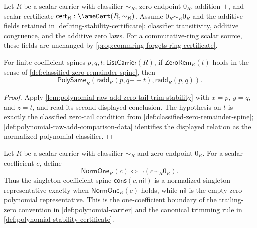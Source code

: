 \begin{proposition}
\label{prop:polynomial-raw-add-right-zero-tail-invariance}
Let $R$ be a scalar carrier with classifier $\sim_R$, zero endpoint $0_R$, addition $+$, and scalar certificate $\mathsf{cert}_R:\NameCert(R,\sim_R)$. Assume $0_R\sim_R0_R$ and the additive fields retained in \autoref{def:ring-stability-certificate}: classifier transitivity, additive congruence, and the additive zero laws. For a commutative-ring scalar source, these fields are unchanged by \autoref{prop:commring-forgets-ring-certificate}.

For finite coefficient spines $p,q,t:\mathsf{ListCarrier}(R)$, if $\mathsf{ZeroRem}_R(t)$ holds in the sense of \autoref{def:classified-zero-remainder-spine}, then
$$
\mathsf{PolySame}_R(\mathsf{radd}_R(p,q{++}t),\mathsf{radd}_R(p,q)).
$$
\end{proposition}
\begin{proof}
Apply \autoref{lem:polynomial-raw-add-zero-tail-trim-stability} with $x=p$, $y=q$, and $z=t$, and read its second displayed conclusion. The hypothesis on $t$ is exactly the classified zero-tail condition from \autoref{def:classified-zero-remainder-spine}; \autoref{def:polynomial-raw-add-comparison-data} identifies the displayed relation as the normalized polynomial classifier.
\end{proof}

\begin{definition}
\label{def:polynomial-normalized-singleton-representative}
Let $R$ be a scalar carrier with classifier $\sim_R$ and zero endpoint $0_R$.
For a scalar coefficient $c$, define
$$
\mathsf{NormOne}_R(c)\Longleftrightarrow \neg(c\sim_R0_R).
$$
Thus the singleton coefficient spine $\mathsf{cons}(c,\mathsf{nil})$ is a normalized singleton representative exactly when $\mathsf{NormOne}_R(c)$ holds, while $\mathsf{nil}$ is the empty zero-polynomial representative. This is the one-coefficient boundary of the trailing-zero convention in \autoref{def:polynomial-carrier} and the canonical trimming rule in \autoref{def:polynomial-stability-certificate}.
\end{definition}

